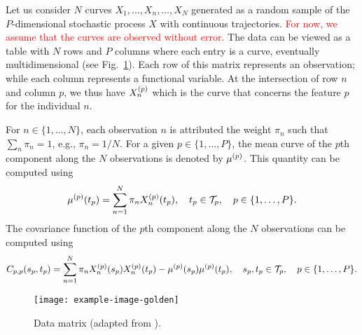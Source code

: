 Let us consider $N$ curves $X_1, \ldots, X_n, \ldots, X_N$ generated as a random sample of the $P$-dimensional stochastic process $X$ with continuous trajectories. \textcolor{red}{For now, we assume that the curves are observed without error.} The data can be viewed as a table with $N$ rows and $P$ columns where each entry is a curve, eventually multidimensional (see Fig.~\ref{fig:data_matrix}). Each row of this matrix represents an observation; while each column represents a functional variable. At the intersection of row $n$ and column $p$, we thus have $X_n^{(p)}$ which is the curve that concerns the feature $p$ for the individual $n$.

For $n \in \{1, \dots, N\}$, each observation $n$ is attributed the weight $\pi_n$ such that $\sum_n \pi_n = 1$, e.g., $\pi_n = 1/N$.
For a given $p \in \{1, \dots, P\}$, the mean curve of the $p$th component along the $N$ observations is denoted by $\mu^{(p)}$. This quantity can be computed using 
\begin{equation*}\label{eq:mu_estimation}
    \mu^{(p)}(t_p) = \sum_{n = 1}^N \pi_nX_n^{(p)}(t_p), \quad t_p \in \mathcal{T}_{p}, \quad p \in \{1, \dots, P\}.
\end{equation*}
The covariance function of the $p$th component along the $N$ observations can be computed using
\begin{equation}\label{eq:cov_estimation}
    C_{p, p}(s_p, t_p) = \sum_{n = 1}^N \pi_nX_n^{(p)}(s_p)X_n^{(p)}(t_p) - \mu^{(p)}(s_p)\mu^{(p)}(t_p), \quad s_p, t_p \in \mathcal{T}_{p}, \quad p \in \{1, \dots, P\}.
\end{equation}

\begin{figure}
    \centering
    \texttt{[image: example-image-golden]}
    \caption{Data matrix (adapted from \cite{berrenderoPrincipalComponentsMultivariate2011}).}
    \label{fig:data_matrix}
\end{figure}

